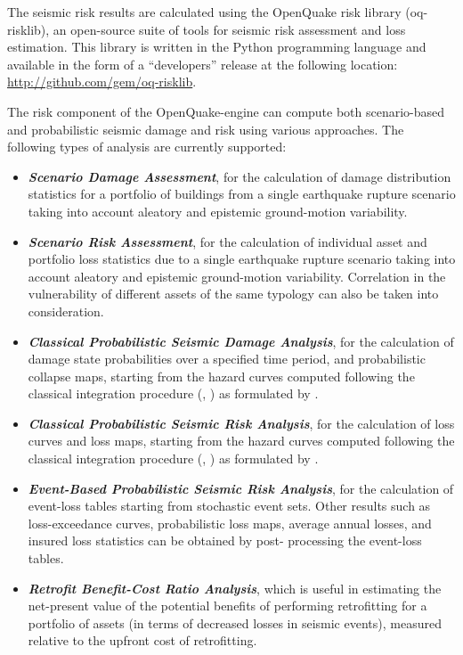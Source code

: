 
The seismic risk results are calculated using the OpenQuake risk library
(oq-risklib), an open-source suite of tools for seismic risk assessment and
loss estimation. This library is written in the Python programming language
and available in the form of a ``developers'' release at the following location:
\href{http://github.com/gem/oq-risklib}{http://github.com/gem/oq-risklib}.

The risk component of the OpenQuake-engine can compute both scenario-based and
probabilistic seismic damage and risk using various approaches. The following
types of analysis are currently supported:

\begin{itemize}

    \item \textit{\textbf{Scenario Damage Assessment}}, for the
	calculation of damage distribution statistics for a portfolio of buildings
	from a single earthquake rupture scenario taking into account aleatory and
	epistemic ground-motion variability.

    \item \textit{\textbf{Scenario Risk Assessment}}, for the calculation of
	individual asset and portfolio loss statistics due to a single earthquake
	rupture scenario taking into account aleatory and epistemic ground-motion
	variability. Correlation in the vulnerability of different assets of the
	same typology can also be taken into consideration.

	\item \textit{\textbf{Classical Probabilistic Seismic Damage Analysis}}, for 
	the calculation of damage state probabilities over a specified time period,  
	and probabilistic collapse maps, starting from the hazard curves 
	computed following the classical integration procedure (\cite{cornell1968}, 
	\citet{mcguire1976}) as formulated by \cite{field2003}.

    \item \textit{\textbf{Classical Probabilistic Seismic Risk Analysis}}, for the
	calculation of loss curves and loss maps, starting from the hazard curves 
	computed following the classical integration procedure (\cite{cornell1968}, 
	\citet{mcguire1976}) as formulated by \cite{field2003}.

	\item \textit{\textbf{Event-Based Probabilistic Seismic Risk Analysis}}, 
	for the calculation of event-loss tables starting from stochastic event sets.
	Other results such as loss-exceedance curves, probabilistic loss maps, 
	average annual losses, and insured loss statistics can be obtained by post-
	processing the event-loss tables.

    \item \textit{\textbf{Retrofit Benefit-Cost Ratio Analysis}}, which is
	useful in estimating the net-present value of the potential benefits of
	performing retrofitting for a portfolio of assets (in terms of decreased
	losses in seismic events), measured relative to the upfront cost of
	retrofitting.

\end{itemize}


